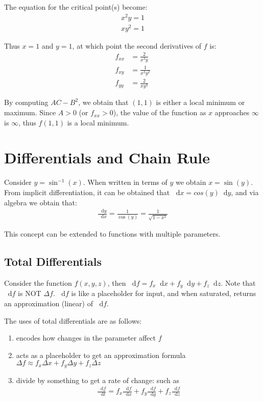 \documentclass[12pt]{article}
\newcommand*\diff{\mathop{}\!\mathrm{d}}
\theoremstyle{definition}
\begin{document}
	The equation for the critical point(s) become:
	\begin{align*}
		x^2y = 1 \\
		xy^2 = 1
	\end{align*}
	
	Thus $x=1$ and $y=1$, at which point the second derivatives of $f$ is:
	\begin{align*}
		f_{xx} &= \frac{2}{x^3y} \\
		f_{xy} &= \frac{1}{x^2y^2} \\
		f_{yy} &= \frac{2}{xy^3}
	\end{align*}
	
	By computing $AC - B^2$, we obtain that $(1, 1)$ is either a local minimum or maximum. Since $A > 0$ (or $f_{xx} > 0$), the value of the function as $x$ approaches $\infty$ is $\infty$, thus $f(1, 1)$ is a local minimum.
	
	\section{Differentials and Chain Rule}
	
	Consider $y = \sin^{-1}(x)$. When written in terms of $y$ we obtain $x = \sin(y)$. From implicit differentiation, it can be obtained that $\diff x = cos(y) \diff y$, and via algebra we obtain that:
	\begin{gather*}
		\frac{\diff y}{\diff x} = \frac{1}{\cos(y)} = \frac{1}{\sqrt{1 - x^2}}
	\end{gather*}
	
	This concept can be extended to functions with multiple parameters.
	
	\subsection{Total Differentials}
	
	Consider the function $f(x, y, z)$, then $\diff f = f_x \diff x + f_y \diff y + f_z \diff z$. Note that $\diff f$ is NOT $\Delta f$. $\diff f$ is like a placeholder for input, and when saturated, returns an approximation (linear) of $\diff f$.
	
	The uses of total differentials are as follows:
	\begin{enumerate}
		\item encodes how changes in the parameter affect $f$
		\item acts as a placeholder to get an approximation formula $\Delta f \approx f_x \Delta x + f_y \Delta y + f_z \Delta z$
		\item divide by something to get a rate of change: such as 
		\begin{gather*}
			\frac{\diff f}{\diff t} = f_x \frac{\diff f}{\diff x} + f_y \frac{\diff f}{\diff y} + f_z \frac{\diff f}{\diff z}
		\end{gather*}
	\end{enumerate}
	
	
	
\end{document}
